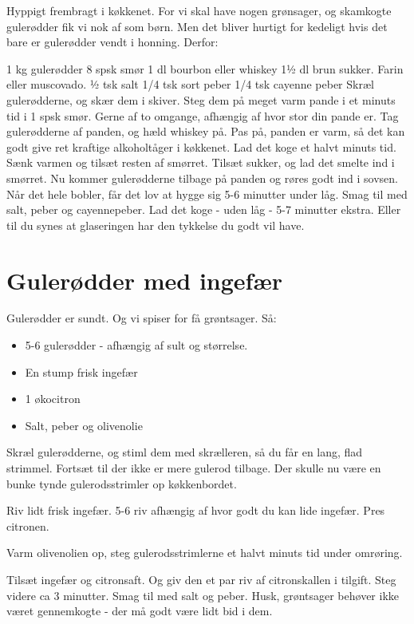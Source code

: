 \documentclass[
]{book}
\providecommand{\tightlist}{%
  \setlength{\itemsep}{0pt}\setlength{\parskip}{0pt}}
\begin{document}
Hyppigt frembragt i køkkenet. For vi skal have nogen grønsager, og skamkogte gulerødder fik vi nok af som børn. Men det bliver hurtigt for kedeligt hvis det bare er gulerødder vendt i honning. Derfor:

1 kg gulerødder
8 spsk smør
1 dl bourbon eller whiskey
1½ dl brun sukker. Farin eller muscovado.
½ tsk salt
1/4 tsk sort peber
1/4 tsk cayenne peber
Skræl gulerødderne, og skær dem i skiver.
Steg dem på meget varm pande i et minuts tid i 1 spsk smør. Gerne af to omgange, afhængig af hvor stor din pande er.
Tag gulerødderne af panden, og hæld whiskey på. Pas på, panden er varm, så det kan godt give ret kraftige alkoholtåger i køkkenet. Lad det koge et halvt minuts tid. Sænk varmen og tilsæt resten af smørret.
Tilsæt sukker, og lad det smelte ind i smørret. Nu kommer gulerødderne tilbage på panden og røres godt ind i sovsen. Når det hele bobler, får det lov at hygge sig 5-6 minutter under låg.
Smag til med salt, peber og cayennepeber. Lad det koge - uden låg - 5-7 minutter ekstra. Eller til du synes at glaseringen har den tykkelse du godt vil have.

\hypertarget{guleruxf8dder-med-ingefuxe6r}{%
\section{Gulerødder med ingefær}\label{guleruxf8dder-med-ingefuxe6r}}

Gulerødder er sundt. Og vi spiser for få grøntsager. Så:

\begin{itemize}
\tightlist
\item
  5-6 gulerødder - afhængig af sult og størrelse.
\item
  En stump frisk ingefær
\item
  1 økocitron
\item
  Salt, peber og olivenolie
\end{itemize}

Skræl gulerødderne, og stiml dem med skrælleren, så du får en lang, flad strimmel. Fortsæt til der ikke er mere gulerod tilbage. Der skulle nu være en bunke tynde gulerodsstrimler op køkkenbordet.

Riv lidt frisk ingefær. 5-6 riv afhængig af hvor godt du kan lide ingefær. Pres citronen.

Varm olivenolien op, steg gulerodsstrimlerne et halvt minuts tid under omrøring.

Tilsæt ingefær og citronsaft. Og giv den et par riv af citronskallen i tilgift. Steg videre ca 3 minutter. Smag til med salt og peber. Husk, grøntsager behøver ikke været gennemkogte - der må godt være lidt bid i dem.
\end{document}
